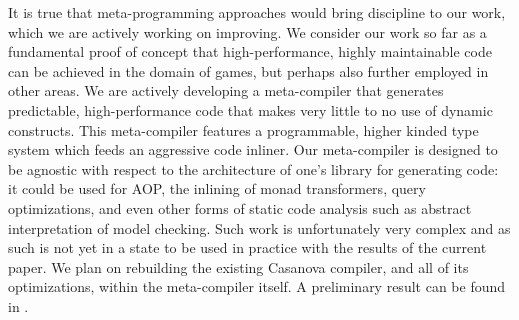 It is true that meta-programming approaches would bring discipline to our work, which we are actively working on improving. We consider our work so far as a fundamental proof of concept that high-performance, highly maintainable code can be achieved in the domain of games, but perhaps also further employed in other areas. We are actively developing a meta-compiler that generates predictable, high-performance code that makes very little to no use of dynamic constructs. This meta-compiler features a programmable, higher kinded type system which feeds an aggressive code inliner. Our meta-compiler is designed to be agnostic with respect to the architecture of one's library for generating code: it could be used for AOP, the inlining of monad transformers, query optimizations, and even other forms of static code analysis such as abstract interpretation of model checking. Such work is unfortunately very complex and as such is not yet in a state to be used in practice with the results of the current paper. We plan on rebuilding the existing Casanova compiler, and all of its optimizations, within the meta-compiler itself. A preliminary result can be found in \cite{meta_casanova}.